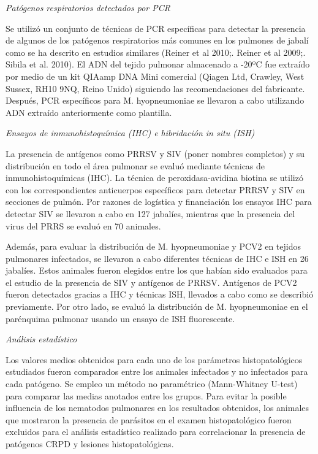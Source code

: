 \documentclass[12pt,a4paper,Spanish]{book}
\begin{document}
\textit{Patógenos respiratorios detectados por PCR}

Se utilizó un conjunto de técnicas de PCR específicas para detectar la presencia de algunos de los patógenos respiratorios más comunes en los pulmones de jabalí como se ha descrito en estudios similares (Reiner et al 2010;. Reiner et al 2009;. Sibila et al. 2010). El ADN del tejido pulmonar almacenado a -20ºC fue extraído por medio de un kit QIAamp DNA Mini comercial (Qiagen Ltd, Crawley, West Sussex, RH10 9NQ, Reino Unido) siguiendo las recomendaciones del fabricante. Después, PCR específicos para M. hyopneumoniae se llevaron a cabo utilizando ADN extraído anteriormente como plantilla.

\textit{Ensayos de inmunohistoquímica (IHC) e hibridación in situ (ISH)}

La presencia de antígenos como PRRSV y SIV (poner nombres completos) y su distribución en todo el área pulmonar se evaluó mediante técnicas de inmunohistoquímicas (IHC). La técnica de peroxidasa-avidina biotina se utilizó con los correspondientes anticuerpos específicos para detectar PRRSV y SIV en secciones de pulmón. Por razones de logística y financiación los ensayos IHC para detectar SIV se llevaron a cabo en 127 jabalíes, mientras que la presencia del virus del PRRS se evaluó en 70 animales.

Además, para evaluar la distribución de M. hyopneumoniae y PCV2 en tejidos pulmonares infectados, se llevaron a cabo diferentes técnicas de IHC e ISH en 26 jabalíes. Estos animales fueron elegidos entre los que habían sido evaluados para el estudio de la presencia de SIV y antígenos de PRRSV. Antígenos de PCV2 fueron detectados gracias a IHC y técnicas ISH, llevados a cabo como se describió previamente. Por otro lado, se evaluó la distribución de M. hyopneumoniae en el parénquima pulmonar usando un ensayo de ISH fluorescente.

\textit{Análisis estadístico}

Los valores medios obtenidos para cada uno de los parámetros histopatológicos estudiados fueron
comparados entre los animales infectados y no infectados para cada patógeno. Se empleo un método no paramétrico (Mann-Whitney U-test) para comparar las medias anotados entre los grupos. Para evitar la posible influencia de los nematodos pulmonares en los resultados obtenidos, los animales que mostraron la presencia de parásitos en el examen histopatológico fueron excluidos para el análisis estadístico realizado para correlacionar la presencia de patógenos CRPD y lesiones histopatológicas.
\end{document}
